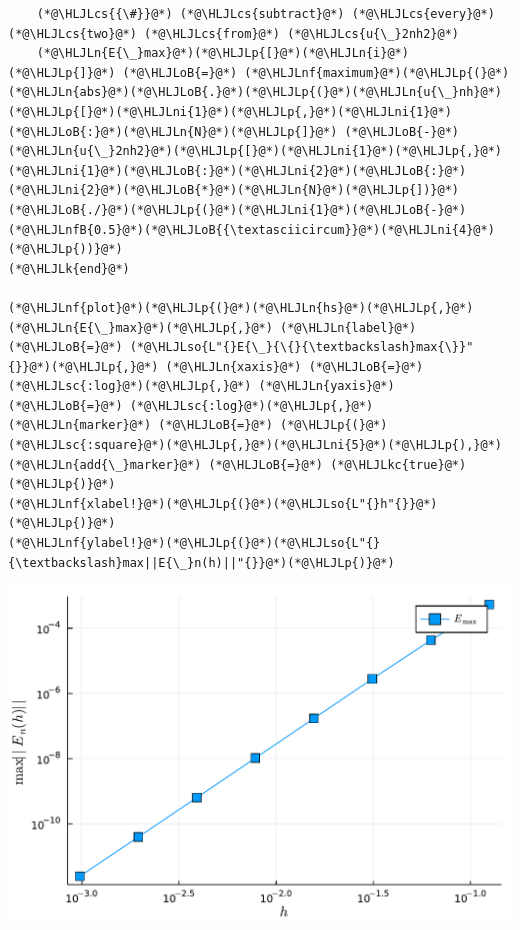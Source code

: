\documentclass[12pt,a4paper]{article}
\newcommand{\HLJLk}[1]{\textcolor[RGB]{148,91,176}{\textbf{#1}}}
\newcommand{\HLJLkc}[1]{\textcolor[RGB]{59,151,46}{\textit{#1}}}
\newcommand{\HLJLn}[1]{#1}
\newcommand{\HLJLnf}[1]{\textcolor[RGB]{66,102,213}{#1}}
\newcommand{\HLJLsc}[1]{\textcolor[RGB]{201,61,57}{#1}}
\newcommand{\HLJLso}[1]{\textcolor[RGB]{201,61,57}{#1}}
\newcommand{\HLJLnfB}[1]{\textcolor[RGB]{59,151,46}{#1}}
\newcommand{\HLJLni}[1]{\textcolor[RGB]{59,151,46}{#1}}
\newcommand{\HLJLoB}[1]{\textcolor[RGB]{102,102,102}{\textbf{#1}}}
\newcommand{\HLJLp}[1]{#1}
\newcommand{\HLJLcs}[1]{\textcolor[RGB]{153,153,119}{\textit{#1}}}
\begin{document}
\begin{lstlisting}
    (*@\HLJLcs{{\#}}@*) (*@\HLJLcs{subtract}@*) (*@\HLJLcs{every}@*) (*@\HLJLcs{two}@*) (*@\HLJLcs{from}@*) (*@\HLJLcs{u{\_}2nh2}@*)
    (*@\HLJLn{E{\_}max}@*)(*@\HLJLp{[}@*)(*@\HLJLn{i}@*)(*@\HLJLp{]}@*) (*@\HLJLoB{=}@*) (*@\HLJLnf{maximum}@*)(*@\HLJLp{(}@*)(*@\HLJLn{abs}@*)(*@\HLJLoB{.}@*)(*@\HLJLp{(}@*)(*@\HLJLn{u{\_}nh}@*)(*@\HLJLp{[}@*)(*@\HLJLni{1}@*)(*@\HLJLp{,}@*)(*@\HLJLni{1}@*)(*@\HLJLoB{:}@*)(*@\HLJLn{N}@*)(*@\HLJLp{]}@*) (*@\HLJLoB{-}@*) (*@\HLJLn{u{\_}2nh2}@*)(*@\HLJLp{[}@*)(*@\HLJLni{1}@*)(*@\HLJLp{,}@*)(*@\HLJLni{1}@*)(*@\HLJLoB{:}@*)(*@\HLJLni{2}@*)(*@\HLJLoB{:}@*)(*@\HLJLni{2}@*)(*@\HLJLoB{*}@*)(*@\HLJLn{N}@*)(*@\HLJLp{])}@*)(*@\HLJLoB{./}@*)(*@\HLJLp{(}@*)(*@\HLJLni{1}@*)(*@\HLJLoB{-}@*)(*@\HLJLnfB{0.5}@*)(*@\HLJLoB{{\textasciicircum}}@*)(*@\HLJLni{4}@*)(*@\HLJLp{))}@*)
(*@\HLJLk{end}@*)

(*@\HLJLnf{plot}@*)(*@\HLJLp{(}@*)(*@\HLJLn{hs}@*)(*@\HLJLp{,}@*) (*@\HLJLn{E{\_}max}@*)(*@\HLJLp{,}@*) (*@\HLJLn{label}@*) (*@\HLJLoB{=}@*) (*@\HLJLso{L"{}E{\_}{\{}{\textbackslash}max{\}}"{}}@*)(*@\HLJLp{,}@*) (*@\HLJLn{xaxis}@*) (*@\HLJLoB{=}@*) (*@\HLJLsc{:log}@*)(*@\HLJLp{,}@*) (*@\HLJLn{yaxis}@*) (*@\HLJLoB{=}@*) (*@\HLJLsc{:log}@*)(*@\HLJLp{,}@*) (*@\HLJLn{marker}@*) (*@\HLJLoB{=}@*) (*@\HLJLp{(}@*)(*@\HLJLsc{:square}@*)(*@\HLJLp{,}@*)(*@\HLJLni{5}@*)(*@\HLJLp{),}@*) (*@\HLJLn{add{\_}marker}@*) (*@\HLJLoB{=}@*) (*@\HLJLkc{true}@*)(*@\HLJLp{)}@*)
(*@\HLJLnf{xlabel!}@*)(*@\HLJLp{(}@*)(*@\HLJLso{L"{}h"{}}@*)(*@\HLJLp{)}@*)
(*@\HLJLnf{ylabel!}@*)(*@\HLJLp{(}@*)(*@\HLJLso{L"{}{\textbackslash}max||E{\_}n(h)||"{}}@*)(*@\HLJLp{)}@*)
\end{lstlisting}

\includegraphics[width=\linewidth]{figures/ass_2_report_4_1.pdf}
\end{document}
